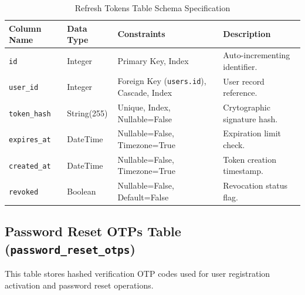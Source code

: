 \begin{table}[h!]
\centering
\small
\renewcommand{\arraystretch}{1.4}
\begin{tabularx}{\textwidth}{l l l X}
    \toprule[1.5pt]
    \rowcolor{primary!5}
    \textbf{\color{primary}Column Name} & \textbf{\color{primary}Data Type} & \textbf{\color{primary}Constraints} & \textbf{\color{primary}Description} \\
    \midrule
    \texttt{id} & Integer & Primary Key, Index & Auto-incrementing identifier. \\
    \texttt{user\_id} & Integer & Foreign Key (\texttt{users.id}), Cascade, Index & User record reference. \\
    \texttt{token\_hash} & String(255) & Unique, Index, Nullable=False & Crytographic signature hash. \\
    \texttt{expires\_at} & DateTime & Nullable=False, Timezone=True & Expiration limit check. \\
    \texttt{created\_at} & DateTime & Nullable=False, Timezone=True & Token creation timestamp. \\
    \texttt{revoked} & Boolean & Nullable=False, Default=False & Revocation status flag. \\
    \bottomrule[1.5pt]
\end{tabularx}
\caption{Refresh Tokens Table Schema Specification}
\label{tab:refresh_tokens_table}
\end{table}

\subsection{Password Reset OTPs Table (\texttt{password\_reset\_otps})}
This table stores hashed verification OTP codes used for user registration activation and password reset operations.


